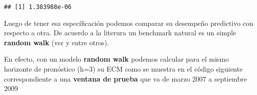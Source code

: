 \documentclass[
]{book}
\newenvironment{Shaded}{\begin{snugshade}}{\end{snugshade}}
\newcommand{\AttributeTok}[1]{\textcolor[rgb]{0.77,0.63,0.00}{#1}}
\newcommand{\DecValTok}[1]{\textcolor[rgb]{0.00,0.00,0.81}{#1}}
\newcommand{\FloatTok}[1]{\textcolor[rgb]{0.00,0.00,0.81}{#1}}
\newcommand{\FunctionTok}[1]{\textcolor[rgb]{0.00,0.00,0.00}{#1}}
\newcommand{\NormalTok}[1]{#1}
\newcommand{\OtherTok}[1]{\textcolor[rgb]{0.56,0.35,0.01}{#1}}
\newcommand{\SpecialCharTok}[1]{\textcolor[rgb]{0.00,0.00,0.00}{#1}}
\newcommand{\StringTok}[1]{\textcolor[rgb]{0.31,0.60,0.02}{#1}}
\begin{document}
\begin{Shaded}
\end{Shaded}

\begin{verbatim}
## [1] 1.383988e-06
\end{verbatim}

Luego de tener esa específicación podemos comparar su desempeño predictivo con respecto a otra. De acuerdo a la literura un benchmark natural es un simple \textbf{random walk} (ver \citet{Ohanian2001} y \citet{Rogoff1983} entre otros).

En efecto, con un modelo \textbf{random walk} podemos calcular para el mismo horizonte de pronóstico (h=3) su ECM como se muestra en el código siguiente correspondiente a una \textbf{ventana de prueba} que va de marzo 2007 a septiembre 2009
\end{document}
